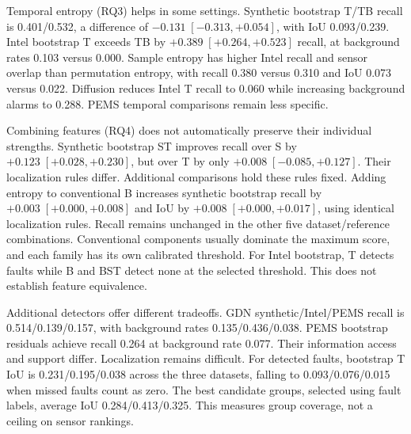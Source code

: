 \documentclass[conference]{IEEEtran}
\begin{document}
Temporal entropy (RQ3) helps in some settings. Synthetic bootstrap T/TB
recall is 0.401/0.532, a difference of $-0.131\;[-0.313,+0.054]$,
with IoU 0.093/0.239. Intel bootstrap T exceeds TB by
$+0.389\;[+0.264,+0.523]$ recall, at background rates 0.103 versus 0.000.
Sample entropy has higher Intel recall and sensor overlap than permutation
entropy, with recall 0.380 versus 0.310 and IoU 0.073 versus 0.022.
Diffusion reduces Intel T recall to 0.060 while increasing background
alarms to 0.288. PEMS temporal comparisons remain less specific.

Combining features (RQ4) does not automatically preserve their individual
strengths. Synthetic bootstrap ST improves recall over S by
$+0.123\;[+0.028,+0.230]$, but over T by only
$+0.008\;[-0.085,+0.127]$. Their localization rules differ.
Additional comparisons hold these rules fixed.
Adding entropy to conventional B increases synthetic bootstrap recall by
$+0.003\;[+0.000,+0.008]$ and IoU by $+0.008\;[+0.000,+0.017]$,
using identical localization rules. Recall remains unchanged in the other
five dataset/reference combinations. Conventional components usually dominate
the maximum score, and each family has its own calibrated threshold.
For Intel bootstrap, T detects faults while B and BST detect none at the
selected threshold. This does not establish feature equivalence.

Additional detectors offer different tradeoffs. GDN synthetic/Intel/PEMS
recall is 0.514/0.139/0.157, with background rates 0.135/0.436/0.038.
PEMS bootstrap residuals achieve recall 0.264 at background rate 0.077.
Their information access and support differ. Localization remains difficult.
For detected faults, bootstrap T IoU is 0.231/0.195/0.038 across the three
datasets, falling to 0.093/0.076/0.015 when missed faults count as zero.
The best candidate groups, selected using fault labels, average IoU
0.284/0.413/0.325. This measures group coverage, not a ceiling on sensor rankings.
\end{document}
